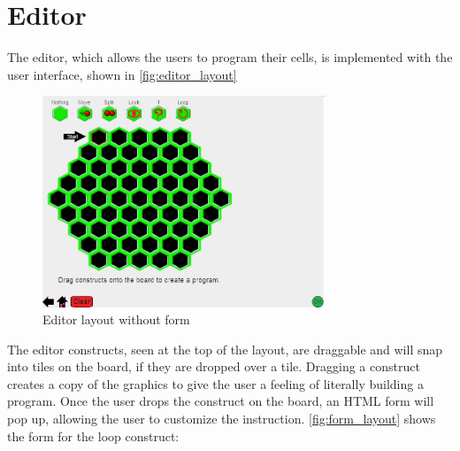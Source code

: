 \section{Editor}
\label{sec:editor}
The editor, which allows the users to program their cells, is implemented with the user interface, shown in \autoref{fig:editor_layout}

\begin{figure}[ht]
\begin{center}
	\includegraphics[width=0.75\textwidth]{img/editor_layout.png}
	\caption{Editor layout without form}
	\label{fig:editor_layout}
\end{center}
\end{figure}

The editor constructs, seen at the top of the layout, are draggable and will snap into tiles on the board, if they are dropped over a tile.
Dragging a construct creates a copy of the graphics to give the user a feeling of literally building a program.
Once the user drops the construct on the board, an HTML form will pop up, allowing the user to customize the instruction.
\autoref{fig:form_layout} shows the form for the loop construct:

